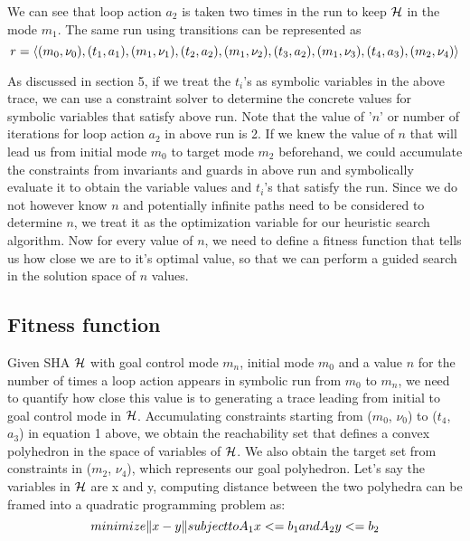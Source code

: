 We can see that loop action $a_{2}$ is taken two times in the run to keep $\mathcal{H}$ in the mode $m_{1}$. The same run using transitions can be represented as   
\begin{equation}
  r = \langle (m_0, \nu_0), (t_1, a_1), (m_1, \nu_1), (t_2, a_2), (m_1, \nu_2), (t_3, a_2), (m_1, \nu_3), (t_4, a_3), (m_2, \nu_4) \rangle
\end{equation}

As discussed in section 5, if we treat the $t_i$'s as symbolic variables in the above trace, we can use a constraint solver to determine the concrete values for symbolic variables that satisfy above run. Note that the value of '$\textit{n}$' or number of iterations for loop action $a_2$ in above run is 2. If we knew the value of $\textit{n}$ that will lead us from initial mode $m_{0}$ to target mode $m_{2}$ beforehand, we could accumulate the constraints from invariants and guards in above run and symbolically evaluate it to obtain the variable values and $t_{i}$'s that satisfy the run. Since we do not however know $\textit{n}$ and potentially infinite paths need to be considered to determine $\textit{n}$, we treat it as the optimization variable for our heuristic search algorithm. Now for every value of $\textit{n}$, we need to define a fitness function that tells us how close we are to it's optimal value, so that we can perform a guided search in the solution space of $\textit{n}$ values. 

\subsection{Fitness function}
Given SHA $\mathcal{H}$ with goal control mode $m_{n}$, initial mode $m_{0}$ and a value $\textit{n}$ for the number of times a loop action appears in symbolic run from $m_{0}$ to $m_{n}$, we need to quantify how close this value is to generating a trace leading from initial to goal control mode in $\mathcal{H}$. Accumulating constraints starting from ($m_{0}$, $\nu_{0}$) to ($t_{4}$, $a_{3}$) in equation 1 above, we obtain the reachability set that defines a convex polyhedron in the space of variables of $\mathcal{H}$. We also obtain the target set from constraints in ($m_{2}$, $\nu_{4}$), which represents our goal polyhedron. Let's say the variables in $\mathcal{H}$ are x and y, computing distance between the two polyhedra can be framed into a quadratic programming problem as: 
\begin{equation}
minimize \|x-y\|
subject to A_{1}x <= b_{1}
and A_{2}y <= b_{2}
\end{equation}

